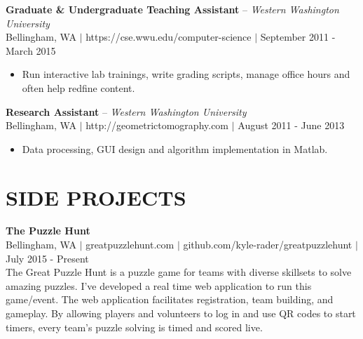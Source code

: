 \documentclass[line,margin]{res}
\begin{document}
\begin{resume}
    {\bf Graduate \& Undergraduate Teaching Assistant} -- {\sl Western Washington University} \\
    {\footnotesize Bellingham, WA $|$ https://cse.wwu.edu/computer-science $|$ September 2011 - March 2015}
    \begin{itemize} \itemsep -2pt
      \item Run interactive lab trainings, write grading scripts, manage office hours and often help redfine content.
    \end{itemize}

    {\bf Research Assistant} -- {\sl Western Washington University} \\
    {\footnotesize Bellingham, WA $|$ http://geometrictomography.com $|$ August 2011 - June 2013}
    \begin{itemize}  \itemsep -2pt
        \item Data processing, GUI design and algorithm implementation in Matlab.
    \end{itemize}



\newpage

\section{SIDE PROJECTS}
    {\bf The Puzzle Hunt} \\
    {\footnotesize Bellingham, WA $|$ greatpuzzlehunt.com $|$ github.com/kyle-rader/greatpuzzlehunt $|$ July 2015 - Present} \\
    The Great Puzzle Hunt is a puzzle game for teams with diverse skillsets to solve amazing puzzles.
    I've developed a real time web application to run this game/event. The web application facilitates registration, team building, and gameplay.
    By allowing players and volunteers to log in and use QR codes to start timers, every team's puzzle solving is timed and scored live.


\end{resume}
\end{document}
